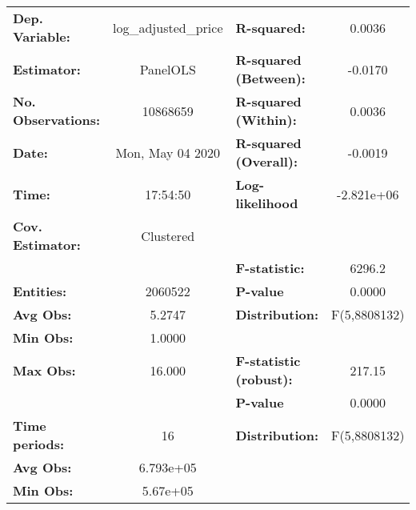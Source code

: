 \documentclass{report}
\begin{document}
\begin{center}
\begin{tabular}{lclc}
\toprule
\textbf{Dep. Variable:}                          & log\_adjusted\_price & \textbf{  R-squared:         }   &      0.0036      \\
\textbf{Estimator:}                              &       PanelOLS       & \textbf{  R-squared (Between):}  &     -0.0170      \\
\textbf{No. Observations:}                       &       10868659       & \textbf{  R-squared (Within):}   &      0.0036      \\
\textbf{Date:}                                   &   Mon, May 04 2020   & \textbf{  R-squared (Overall):}  &     -0.0019      \\
\textbf{Time:}                                   &       17:54:50       & \textbf{  Log-likelihood     }   &    -2.821e+06    \\
\textbf{Cov. Estimator:}                         &      Clustered       & \textbf{                     }   &                  \\
\textbf{}                                        &                      & \textbf{  F-statistic:       }   &      6296.2      \\
\textbf{Entities:}                               &       2060522        & \textbf{  P-value            }   &      0.0000      \\
\textbf{Avg Obs:}                                &        5.2747        & \textbf{  Distribution:      }   &   F(5,8808132)   \\
\textbf{Min Obs:}                                &        1.0000        & \textbf{                     }   &                  \\
\textbf{Max Obs:}                                &        16.000        & \textbf{  F-statistic (robust):} &      217.15      \\
\textbf{}                                        &                      & \textbf{  P-value            }   &      0.0000      \\
\textbf{Time periods:}                           &          16          & \textbf{  Distribution:      }   &   F(5,8808132)   \\
\textbf{Avg Obs:}                                &      6.793e+05       & \textbf{                     }   &                  \\
\textbf{Min Obs:}                                &       5.67e+05       & \textbf{                     }   &                  \\

\end{tabular}
\end{center}
\end{document}
